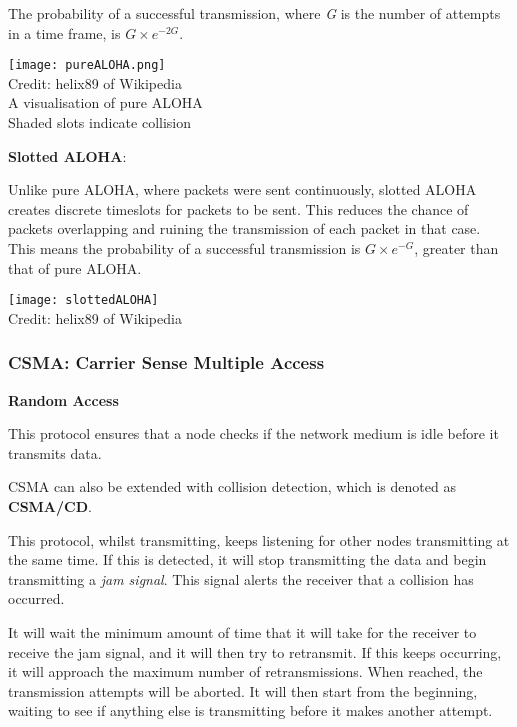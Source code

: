 \documentclass{article}
\begin{document}
The probability of a successful transmission, where \textit{G} is the number of attempts in a time frame, is $G\times e^{-2G}$.

\begin{center}
  \texttt{[image: pureALOHA.png]}\\
  \tiny{Credit: helix89 of Wikipedia}\\
  A visualisation of pure ALOHA\\
  Shaded slots indicate collision
\end{center}

\filbreak
\textbf{Slotted ALOHA}:

Unlike pure ALOHA, where packets were sent continuously, slotted ALOHA creates discrete timeslots for packets to be sent. This reduces the chance of packets overlapping and ruining the transmission of each packet in that case. This means the probability of a successful transmission is $G\times e^{-G}$, greater than that of pure ALOHA.

\begin{center}
  \texttt{[image: slottedALOHA]}\\
   \tiny{Credit: helix89 of Wikipedia}\\
\end{center}

\subsubsection{CSMA: Carrier Sense Multiple Access}

\textbf{Random Access}

This protocol ensures that a node checks if the network medium is idle before it transmits data.

CSMA can also be extended with collision detection, which is denoted as \textbf{CSMA/CD}.

This protocol, whilst transmitting, keeps listening for other nodes transmitting at the same time. If this is detected, it will stop transmitting the data and begin transmitting a \textit{jam signal}. This signal alerts the receiver that a collision has occurred. 

It will wait the minimum amount of time that it will take for the receiver to receive the jam signal, and it will then try to retransmit. If this keeps occurring, it will approach the maximum number of retransmissions. When reached, the transmission attempts will be aborted. It will then start from the beginning, waiting to see if anything else is transmitting before it makes another attempt.
\end{document}
